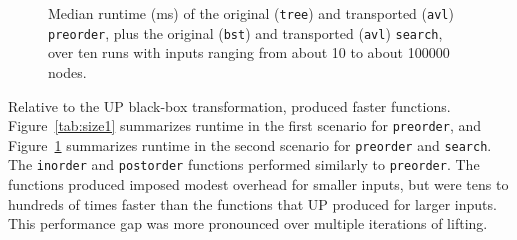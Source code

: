 \begin{figure}
\small
{}
\vspace{-0.25cm}
\caption{Median runtime (ms) of the original (\lstinline{tree}) and transported (\lstinline{avl}) \lstinline{preorder},
plus the original (\lstinline{bst}) and transported (\lstinline{avl}) \lstinline{search}, over ten runs with inputs ranging from about 10 to about 100000 nodes.}
\label{tab:size2}
\end{figure}

Relative to the UP black-box transformation, \toolnamec produced faster functions.
Figure~\ref{tab:size1} summarizes
runtime in the first scenario for \lstinline{preorder},
and Figure~\ref{tab:size2} summarizes
runtime in the second scenario for \lstinline{preorder} and \lstinline{search}.
The \lstinline{inorder} and \lstinline{postorder} functions performed similarly to \lstinline{preorder}.
The functions \toolnamec produced imposed modest overhead for smaller inputs, but were
tens to hundreds of times faster than the functions that UP produced for larger inputs.
This performance gap was more pronounced over multiple iterations of lifting.

